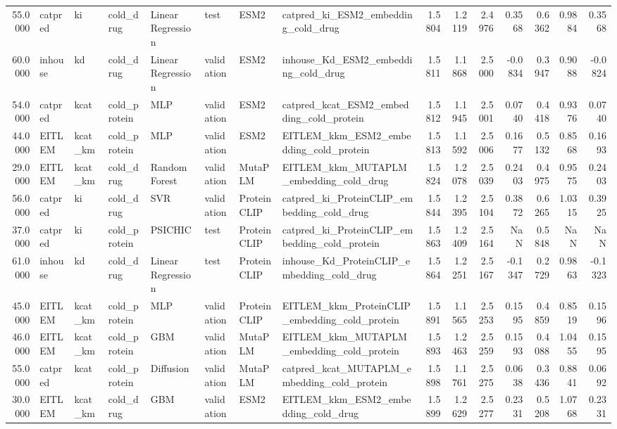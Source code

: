 \begin{tabular}{rlllllllrrrrrrr}
55.0000 & catpred & ki & cold_drug & Linear Regression & test & ESM2 & catpred_ki_ESM2_embedding_cold_drug & 1.5804 & 1.2119 & 2.4976 & 0.3568 & 0.6362 & 0.9884 & 0.3568 \\
60.0000 & inhouse & kd & cold_drug & Linear Regression & validation & ESM2 & inhouse_Kd_ESM2_embedding_cold_drug & 1.5811 & 1.1868 & 2.5000 & -0.0834 & 0.3947 & 0.9088 & -0.0824 \\
54.0000 & catpred & kcat & cold_protein & MLP & validation & ESM2 & catpred_kcat_ESM2_embedding_cold_protein & 1.5812 & 1.1945 & 2.5001 & 0.0740 & 0.4418 & 0.9376 & 0.0740 \\
44.0000 & EITLEM & kcat_km & cold_protein & MLP & validation & ESM2 & EITLEM_kkm_ESM2_embedding_cold_protein & 1.5813 & 1.1592 & 2.5006 & 0.1677 & 0.5132 & 0.8568 & 0.1693 \\
29.0000 & EITLEM & kcat_km & cold_drug & Random Forest & validation & MutaPLM & EITLEM_kkm_MUTAPLM_embedding_cold_drug & 1.5824 & 1.2078 & 2.5039 & 0.2403 & 0.4975 & 0.9575 & 0.2403 \\
56.0000 & catpred & ki & cold_drug & SVR & validation & ProteinCLIP & catpred_ki_ProteinCLIP_embedding_cold_drug & 1.5844 & 1.2395 & 2.5104 & 0.3872 & 0.6265 & 1.0315 & 0.3925 \\
37.0000 & catpred & ki & cold_protein & PSICHIC & test & ProteinCLIP & catpred_ki_ProteinCLIP_embedding_cold_protein & 1.5863 & 1.2409 & 2.5164 & NaN & 0.5848 & NaN & NaN \\
61.0000 & inhouse & kd & cold_drug & Linear Regression & test & ProteinCLIP & inhouse_Kd_ProteinCLIP_embedding_cold_drug & 1.5864 & 1.2251 & 2.5167 & -0.1347 & 0.2729 & 0.9863 & -0.1323 \\
45.0000 & EITLEM & kcat_km & cold_protein & MLP & validation & ProteinCLIP & EITLEM_kkm_ProteinCLIP_embedding_cold_protein & 1.5891 & 1.1565 & 2.5253 & 0.1595 & 0.4859 & 0.8519 & 0.1596 \\
46.0000 & EITLEM & kcat_km & cold_protein & GBM & validation & MutaPLM & EITLEM_kkm_MUTAPLM_embedding_cold_protein & 1.5893 & 1.2463 & 2.5259 & 0.1593 & 0.4088 & 1.0455 & 0.1595 \\
55.0000 & catpred & kcat & cold_protein & Diffusion & validation & MutaPLM & catpred_kcat_MUTAPLM_embedding_cold_protein & 1.5898 & 1.1761 & 2.5275 & 0.0638 & 0.3436 & 0.8841 & 0.0692 \\
30.0000 & EITLEM & kcat_km & cold_drug & GBM & validation & ESM2 & EITLEM_kkm_ESM2_embedding_cold_drug & 1.5899 & 1.2629 & 2.5277 & 0.2331 & 0.5208 & 1.0768 & 0.2331 \\

\end{tabular}
